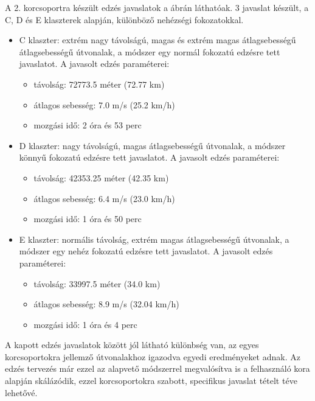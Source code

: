 \noindent A 2. korcsoportra készült edzés javaslatok a  ábrán láthatóak. 3 javaslat készült, a C, D és E klaszterek alapján, különböző nehézségi fokozatokkal. 
\begin{itemize}
	\item C klaszter: extrém nagy távolságú, magas és extrém magas átlagsebességű átlagsebességű útvonalak, a módszer egy normál fokozatú edzésre tett javaslatot. A javasolt edzés paraméterei:
	\begin{itemize}
		\item távolság: 72773.5 méter (72.77 km)
		\item átlagos sebesség: 7.0 m/s (25.2 km/h)
		\item mozgási idő: 2 óra és 53 perc
	\end{itemize}
	\item D klaszter: nagy távolságú, magas átlagsebességű útvonalak, a módszer könnyű fokozatú edzésre tett javaslatot. A javasolt edzés paraméterei:
	\begin{itemize}
		\item távolság: 42353.25 méter (42.35 km)
		\item átlagos sebesség: 6.4 m/s (23.0 km/h)
		\item mozgási idő: 1 óra és 50 perc
	\end{itemize}
	\item E klaszter: normális távolság, extrém magas átlagsebességű útvonalak, a módszer egy nehéz fokozatú edzésre tett javaslatot. A javasolt edzés paraméterei:
	\begin{itemize}
		\item távolság: 33997.5 méter (34.0 km)
		\item átlagos sebesség: 8.9 m/s (32.04 km/h)
		\item mozgási idő: 1 óra és 4 perc
	\end{itemize}
\end{itemize}



A kapott edzés javaslatok között jól látható különbség van, az egyes korcsoportokra jellemző útvonalakhoz igazodva egyedi eredményeket adnak. Az edzés tervezés már ezzel az alapvető módszerrel megvalósítva is a felhasználó kora alapján skálázódik, ezzel korcsoportokra szabott, specifikus javaslat tételt téve lehetővé.















